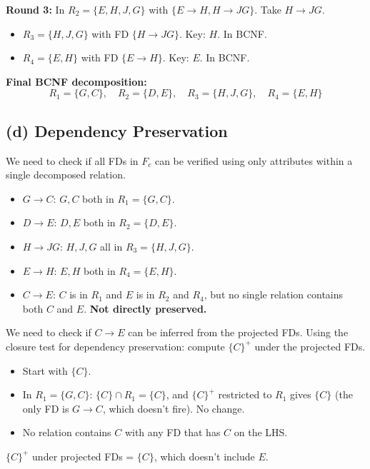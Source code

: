 \documentclass[11pt]{article}
\begin{document}
\noindent\textbf{Round 3:} In $R_2 = \{E, H, J, G\}$ with $\{E \to H, H \to JG\}$. Take $H \to JG$.
\begin{itemize}
  \item $R_3 = \{H, J, G\}$ with FD $\{H \to JG\}$. Key: $H$. In BCNF.
  \item $R_4 = \{E, H\}$ with FD $\{E \to H\}$. Key: $E$. In BCNF.
\end{itemize}

\medskip
\noindent\textbf{Final BCNF decomposition:}
\[
\boxed{R_1 = \{G, C\},\quad R_2 = \{D, E\},\quad R_3 = \{H, J, G\},\quad R_4 = \{E, H\}}
\]

\subsection{(d) Dependency Preservation}

We need to check if all FDs in $F_c$ can be verified using only attributes within a single decomposed relation.

\begin{itemize}
  \item $G \to C$: $G, C$ both in $R_1 = \{G, C\}$. \checkmark
  \item $D \to E$: $D, E$ both in $R_2 = \{D, E\}$. \checkmark
  \item $H \to JG$: $H, J, G$ all in $R_3 = \{H, J, G\}$. \checkmark
  \item $E \to H$: $E, H$ both in $R_4 = \{E, H\}$. \checkmark
  \item $C \to E$: $C$ is in $R_1$ and $E$ is in $R_2$ and $R_4$, but no single relation contains both $C$ and $E$. \textbf{Not directly preserved.}
\end{itemize}

We need to check if $C \to E$ can be inferred from the projected FDs. Using the closure test for dependency preservation: compute $\{C\}^+$ under the projected FDs.
\begin{itemize}
  \item Start with $\{C\}$.
  \item In $R_1 = \{G,C\}$: $\{C\} \cap R_1 = \{C\}$, and $\{C\}^+$ restricted to $R_1$ gives $\{C\}$ (the only FD is $G \to C$, which doesn't fire). No change.
  \item No relation contains $C$ with any FD that has $C$ on the LHS.
\end{itemize}
$\{C\}^+$ under projected FDs = $\{C\}$, which doesn't include $E$.
\end{document}
